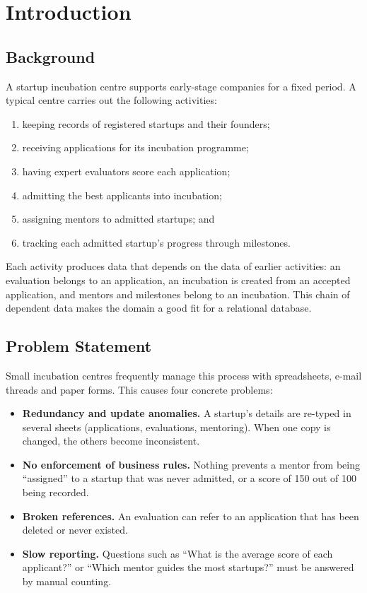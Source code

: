 \chapter{Introduction}
\label{ch:introduction}

\section{Background}
A startup incubation centre supports early-stage companies for a fixed period. A typical
centre carries out the following activities:
\begin{enumerate}
  \item keeping records of registered startups and their founders;
  \item receiving applications for its incubation programme;
  \item having expert evaluators score each application;
  \item admitting the best applicants into incubation;
  \item assigning mentors to admitted startups; and
  \item tracking each admitted startup's progress through milestones.
\end{enumerate}
Each activity produces data that depends on the data of earlier activities: an evaluation
belongs to an application, an incubation is created from an accepted application, and
mentors and milestones belong to an incubation. This chain of dependent data makes the domain
a good fit for a relational database.

\section{Problem Statement}
\label{sec:problem}
Small incubation centres frequently manage this process with spreadsheets, e-mail threads and
paper forms. This causes four concrete problems:
\begin{itemize}
  \item \textbf{Redundancy and update anomalies.} A startup's details are re-typed in several
        sheets (applications, evaluations, mentoring). When one copy is changed, the others
        become inconsistent.
  \item \textbf{No enforcement of business rules.} Nothing prevents a mentor from being
        ``assigned'' to a startup that was never admitted, or a score of 150 out of 100 being
        recorded.
  \item \textbf{Broken references.} An evaluation can refer to an application that has been
        deleted or never existed.
  \item \textbf{Slow reporting.} Questions such as ``What is the average score of each
        applicant?'' or ``Which mentor guides the most startups?'' must be answered by manual
        counting.
\end{itemize}

